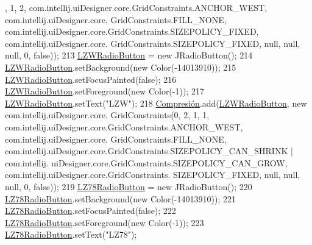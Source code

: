 \begin{DoxyCode}
      , 1, 2, com.intellij.uiDesigner.core.GridConstraints.ANCHOR\_WEST, com.intellij.uiDesigner.core.
      GridConstraints.FILL\_NONE, com.intellij.uiDesigner.core.GridConstraints.SIZEPOLICY\_FIXED, com.intellij.uiDesigner.core.
      GridConstraints.SIZEPOLICY\_FIXED, null, null, null, 0, \textcolor{keyword}{false}));
213         \hyperlink{classpresentacion_1_1form_1_1PopUp__Comp_a810fe251f9c88e3b83ce466feafafe2e}{LZWRadioButton} = \textcolor{keyword}{new} JRadioButton();
214         \hyperlink{classpresentacion_1_1form_1_1PopUp__Comp_a810fe251f9c88e3b83ce466feafafe2e}{LZWRadioButton}.setBackground(\textcolor{keyword}{new} Color(-14013910));
215         \hyperlink{classpresentacion_1_1form_1_1PopUp__Comp_a810fe251f9c88e3b83ce466feafafe2e}{LZWRadioButton}.setFocusPainted(\textcolor{keyword}{false});
216         \hyperlink{classpresentacion_1_1form_1_1PopUp__Comp_a810fe251f9c88e3b83ce466feafafe2e}{LZWRadioButton}.setForeground(\textcolor{keyword}{new} Color(-1));
217         \hyperlink{classpresentacion_1_1form_1_1PopUp__Comp_a810fe251f9c88e3b83ce466feafafe2e}{LZWRadioButton}.setText(\textcolor{stringliteral}{"LZW"});
218         \hyperlink{classpresentacion_1_1form_1_1PopUp__Comp_a5769b499f21466bae765c41428512966}{Compresión}.add(\hyperlink{classpresentacion_1_1form_1_1PopUp__Comp_a810fe251f9c88e3b83ce466feafafe2e}{LZWRadioButton}, \textcolor{keyword}{new} com.intellij.uiDesigner.core.
      GridConstraints(0, 2, 1, 1, com.intellij.uiDesigner.core.GridConstraints.ANCHOR\_WEST, com.intellij.uiDesigner.core.
      GridConstraints.FILL\_NONE, com.intellij.uiDesigner.core.GridConstraints.SIZEPOLICY\_CAN\_SHRINK | com.intellij.
      uiDesigner.core.GridConstraints.SIZEPOLICY\_CAN\_GROW, com.intellij.uiDesigner.core.GridConstraints.
      SIZEPOLICY\_FIXED, null, null, null, 0, \textcolor{keyword}{false}));
219         \hyperlink{classpresentacion_1_1form_1_1PopUp__Comp_ac750ecbde516e2fee470693124d2ff63}{LZ78RadioButton} = \textcolor{keyword}{new} JRadioButton();
220         \hyperlink{classpresentacion_1_1form_1_1PopUp__Comp_ac750ecbde516e2fee470693124d2ff63}{LZ78RadioButton}.setBackground(\textcolor{keyword}{new} Color(-14013910));
221         \hyperlink{classpresentacion_1_1form_1_1PopUp__Comp_ac750ecbde516e2fee470693124d2ff63}{LZ78RadioButton}.setFocusPainted(\textcolor{keyword}{false});
222         \hyperlink{classpresentacion_1_1form_1_1PopUp__Comp_ac750ecbde516e2fee470693124d2ff63}{LZ78RadioButton}.setForeground(\textcolor{keyword}{new} Color(-1));
223         \hyperlink{classpresentacion_1_1form_1_1PopUp__Comp_ac750ecbde516e2fee470693124d2ff63}{LZ78RadioButton}.setText(\textcolor{stringliteral}{"LZ78"});

\end{DoxyCode}
